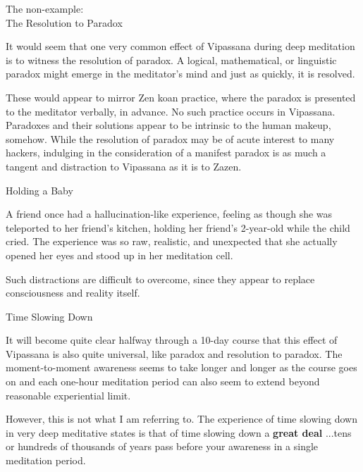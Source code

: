 \documentclass{article}
\begin{document}
\vspace{1cm}
\begin{center}
  \LARGE{The non-example:}\\
  \LARGE{The Resolution to Paradox}
\end{center}

It would seem that one very common effect of Vipassana during deep meditation is to witness the resolution of paradox. A logical, mathematical, or linguistic paradox might emerge in the meditator's mind and just as quickly, it is resolved.

These would appear to mirror Zen koan practice, where the paradox is presented to the meditator verbally, in advance. No such practice occurs in Vipassana. Paradoxes and their solutions appear to be intrinsic to the human makeup, somehow. While the resolution of paradox may be of acute interest to many hackers, indulging in the consideration of a manifest paradox is as much a tangent and distraction to Vipassana as it is to Zazen.

\vspace{1cm}
\begin{center}
  \LARGE{Holding a Baby}
\end{center}

A friend once had a hallucination-like experience, feeling as though she was teleported to her friend's kitchen, holding her friend's 2-year-old while the child cried. The experience was so raw, realistic, and unexpected that she actually opened her eyes and stood up in her meditation cell.

Such distractions are difficult to overcome, since they appear to replace consciousness and reality itself.

\vspace{1cm}
\begin{center}
  \LARGE{Time Slowing Down}
\end{center}

It will become quite clear halfway through a 10-day course that this effect of Vipassana is also quite universal, like paradox and resolution to paradox. The moment-to-moment awareness seems to take longer and longer as the course goes on and each one-hour meditation period can also seem to extend beyond reasonable experiential limit.

However, this is not what I am referring to. The experience of time slowing down in very deep meditative states is that of time slowing down a \textbf{great deal} ...tens or hundreds of thousands of years pass before your awareness in a single meditation period.
\end{document}
